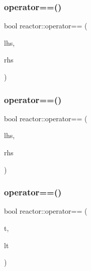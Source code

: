 \mbox{\label{namespacereactor_a0c98d4882f478da43c2c1a169a1fedd2}} 
\subsubsection{\texorpdfstring{operator==()}{operator==()}\hspace{0.1cm}{\footnotesize\ttfamily [1/11]}}
{\footnotesize\ttfamily bool reactor\+::operator== (\begin{DoxyParamCaption}\item[{const \hyperlink{classreactor_1_1Tag}{Tag} \&}]{lhs,  }\item[{const \hyperlink{classreactor_1_1Tag}{Tag} \&}]{rhs }\end{DoxyParamCaption})}

\mbox{\label{namespacereactor_a55f3e1662b62c0347fb588c294b3f471}} 
\subsubsection{\texorpdfstring{operator==()}{operator==()}\hspace{0.1cm}{\footnotesize\ttfamily [2/11]}}
{\footnotesize\ttfamily bool reactor\+::operator== (\begin{DoxyParamCaption}\item[{const \hyperlink{classreactor_1_1LogicalTime}{Logical\+Time} \&}]{lhs,  }\item[{const \hyperlink{classreactor_1_1Tag}{Tag} \&}]{rhs }\end{DoxyParamCaption})}

\mbox{\label{namespacereactor_a97c015047b9fb102d5b41e244da88917}} 
\subsubsection{\texorpdfstring{operator==()}{operator==()}\hspace{0.1cm}{\footnotesize\ttfamily [3/11]}}
{\footnotesize\ttfamily bool reactor\+::operator== (\begin{DoxyParamCaption}\item[{const \hyperlink{classreactor_1_1Tag}{Tag} \&}]{t,  }\item[{const \hyperlink{classreactor_1_1LogicalTime}{Logical\+Time} \&}]{lt }\end{DoxyParamCaption})\hspace{0.3cm}{\ttfamily [inline]}}

